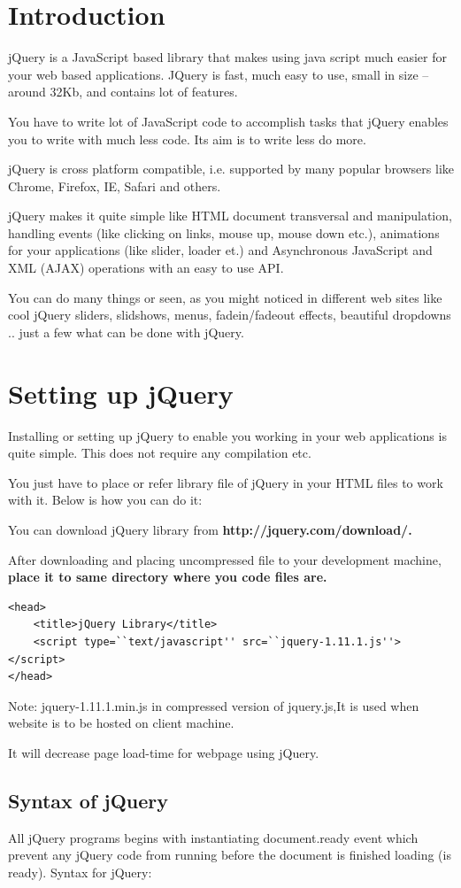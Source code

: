 \documentclass[11pt,a4paper]{article}
\author{TalentSprint}
\date{}
\begin{document}
\section*{Introduction}
jQuery is a JavaScript based library that makes using java script much easier for your web based applications. JQuery is fast, much easy to use, small in size – around 32Kb, and contains lot of features.

You have to write lot of JavaScript code to accomplish tasks that jQuery enables you to write with much less code. Its aim is to write less do more.

jQuery is cross platform compatible, i.e. supported by many popular browsers like Chrome, Firefox, IE, Safari and others.

jQuery makes it quite simple like HTML document transversal and manipulation, handling events (like clicking on links, mouse up, mouse down etc.), animations for your applications (like slider, loader et.) and Asynchronous JavaScript and XML (AJAX) operations with an easy to use API.

You can do many things or seen, as you might noticed in different web sites like cool jQuery sliders, slidshows, menus, fadein/fadeout effects, beautiful dropdowns .. just a few what can be done with jQuery.

\section*{Setting up jQuery}
Installing or setting up jQuery to enable you working in your web applications is quite simple. This does not require any compilation etc.

You just have to place or refer library file of jQuery in your HTML files to work with it. Below is how you can do it:

You can download jQuery library from \textbf{http://jquery.com/download/.}

After downloading and placing uncompressed file to your development machine, \textbf{place it to same directory where you code files are.} 
\begin{lstlisting}
<head>
    <title>jQuery Library</title>
    <script type=``text/javascript'' src=``jquery-1.11.1.js''></script>
</head>
\end{lstlisting}
Note: jquery-1.11.1.min.js in compressed version of jquery.js,It is used when website is to be hosted on client machine.

It will decrease page load-time for webpage using jQuery.
\subsection*{Syntax of jQuery}
All jQuery programs begins with instantiating document.ready event which prevent any jQuery code from running before the document is finished loading (is ready).
Syntax for jQuery:
\end{document}
